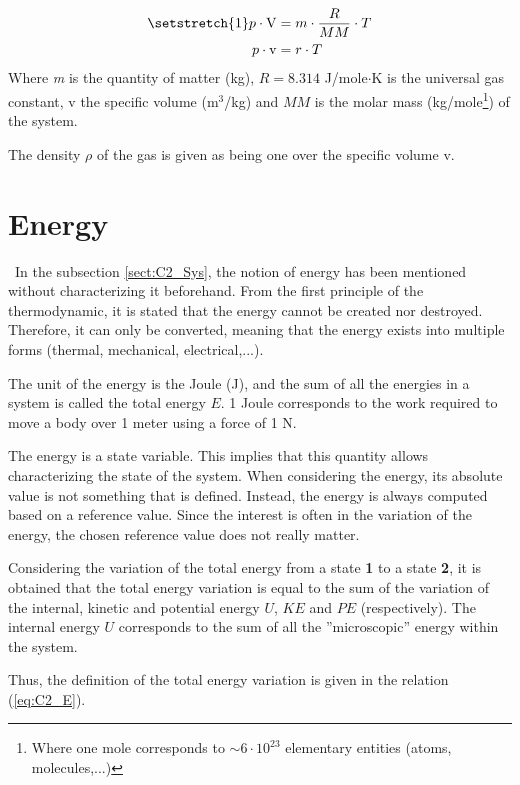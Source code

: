 \begin{align}
\setstretch{1}
p\cdot \mathrm{V} &= m\cdot\frac{R}{MM}\cdot T\nonumber\\
p\cdot \mathrm{v} &= r\cdot T\label{eq:C2_GP}    
\end{align}
Where \textit{m} is the quantity of matter (kg), $R=8.314$ J/mole$\cdot$K is the universal gas constant, $\mathrm{v}$ the specific volume (m$^3$/kg) and $MM$ is the molar mass (kg/mole\footnote{Where one mole corresponds to $\sim 6\cdot 10^{23}$ elementary entities (atoms, molecules,...)}) of the system. 

The density $\rho$ of the gas is given as being one over the specific volume $\mathrm{v}$.
\section{Energy}\label{sect:C2_Ener}
\quad\, In the subsection \ref{sect:C2_Sys}, the notion of energy has been mentioned without characterizing it beforehand. From the first principle of the thermodynamic, it is stated that the energy cannot be created nor destroyed. Therefore, it can only be converted, meaning that the energy exists into multiple forms (thermal, mechanical, electrical,...)\cite{thermoApp_2}. 

The unit of the energy is the Joule (J), and the sum of all the energies in a system is called the total energy $E$. 1 Joule corresponds to the work required to move a body over 1 meter using a force of 1 N.

The energy is a state variable. This implies that this quantity allows characterizing the state of the system. When considering the energy, its absolute value is not something that is defined. Instead, the energy is always computed based on a reference value. Since the interest is often in the variation of the energy, the chosen reference value does not really matter.

Considering the variation of the total energy from a state \textbf{1} to a state \textbf{2}, it is obtained that the total energy variation is equal to the sum of the variation of the internal, kinetic and potential energy $U$, $KE$ and $PE$ (respectively). The internal energy $U$ corresponds to the sum of all the ''microscopic'' energy within the system.  

Thus, the definition of the total energy variation is given in the relation (\ref{eq:C2_E}).

